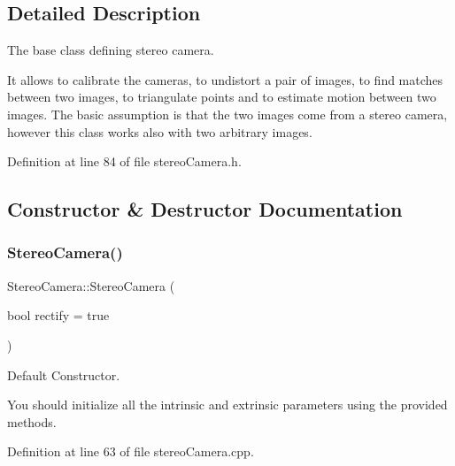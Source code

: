\subsection{Detailed Description}
The base class defining stereo camera. 

It allows to calibrate the cameras, to undistort a pair of images, to find matches between two images, to triangulate points and to estimate motion between two images. The basic assumption is that the two images come from a stereo camera, however this class works also with two arbitrary images. 

Definition at line 84 of file stereo\+Camera.\+h.



\subsection{Constructor \& Destructor Documentation}
\mbox{\label{classStereoCamera_a11256fe5a509436abc714a594b6cc801}} 
\subsubsection{\texorpdfstring{StereoCamera()}{StereoCamera()}\hspace{0.1cm}{\footnotesize\ttfamily [1/3]}}
{\footnotesize\ttfamily Stereo\+Camera\+::\+Stereo\+Camera (\begin{DoxyParamCaption}\item[{bool}]{rectify = {\ttfamily true} }\end{DoxyParamCaption})}



Default Constructor. 

You should initialize all the intrinsic and extrinsic parameters using the provided methods. 

Definition at line 63 of file stereo\+Camera.\+cpp.


\begin{DoxyCode}{0}

\end{DoxyCode}
\mbox{\label{classStereoCamera_a0c2cd4c7b5a0cdb96370c29a42601f40}} 
